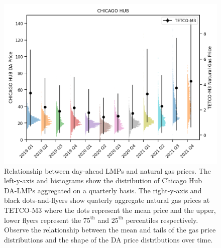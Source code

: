 \begin{figure}[htbp]
    \caption[Relationship between quarterly aggregated day-ahead prices and natural gas prices]{
        Relationship between day-ahead LMPs and natural gas prices.
        The left-y-axis and histograms show the distribution of Chicago Hub DA-LMPs aggregated
        on a quarterly basis.
        The right-y-axis and black dots-and-flyers show quaterly aggregate natural gas prices at TETCO-M3
        where the dots represent the mean price and the upper, lower flyers represent the $75^{\text{th}}$ and
        $25^{\text{th}}$ percentiles respectively.
        Observe the relationship between the mean and tails of the gas price distributions and the shape
        of the DA price distributions over time.
    }
    \begin{center}
        \setlength{\fboxsep}{0pt}%
        \setlength{\fboxrule}{1pt}%
        \includegraphics[width=120mm]{figs/chicago_hub_tetco_dists}
    \end{center}
    \label{fig:price_gas_hist}
\end{figure}


